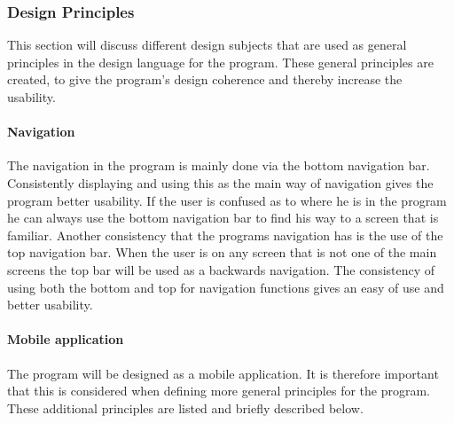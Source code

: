 \subsubsection{Design Principles}
This section will discuss different design subjects that are used as general principles in the design language for the program. These general principles are created, to give the program's design coherence and thereby increase the usability.

\paragraph{Navigation}
The navigation in the program is mainly done via the bottom navigation bar. Consistently displaying and using this as the main way of navigation gives the program better usability. If the user is confused as to where he is in the program he can always use the bottom navigation bar to find his way to a screen that is familiar. Another consistency that the programs navigation has is the use of the top navigation bar. When the user is on any screen that is not one of the main screens the top bar will be used as a backwards navigation. The consistency of using both the bottom and top for navigation functions gives an easy of use and better usability.

\paragraph{Mobile application}
The program will be designed as a mobile application. It is therefore important that this is considered when defining more general principles for the program. These additional principles are listed and briefly described below.

